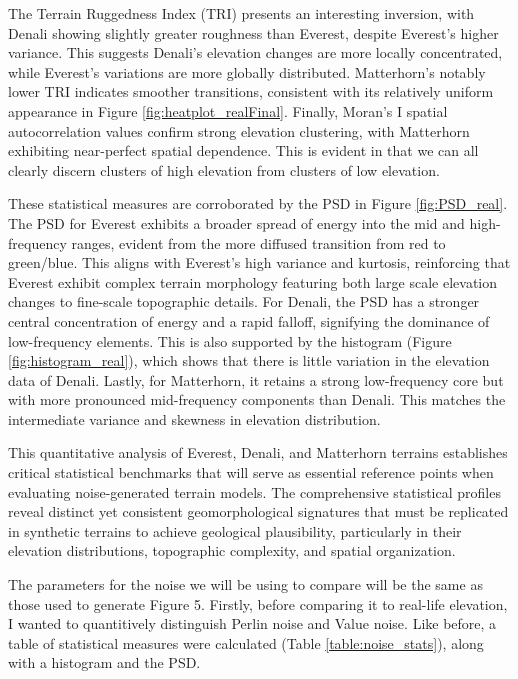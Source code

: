 The Terrain Ruggedness Index (TRI) presents an interesting inversion, with Denali showing slightly greater roughness than Everest, despite Everest's higher variance. This suggests 
Denali's elevation changes are more locally concentrated, while Everest's variations are more globally distributed. Matterhorn's notably lower TRI indicates smoother transitions, 
consistent with its relatively uniform appearance in Figure \ref{fig:heatplot_realFinal}. Finally, Moran's I spatial autocorrelation values confirm strong elevation clustering, with Matterhorn exhibiting near-perfect 
spatial dependence. This is evident in that we can all clearly discern clusters of high elevation from clusters of low elevation. 

These statistical measures are corroborated by the PSD in Figure \ref{fig:PSD_real}. The PSD for Everest exhibits a broader spread of energy into the mid and high-frequency ranges, evident from the more 
diffused transition from red to green/blue. This aligns with Everest's high variance and kurtosis, reinforcing that Everest exhibit complex terrain morphology featuring both large scale 
elevation changes to fine-scale topographic details. For Denali, the PSD has a stronger central concentration of energy and a rapid falloff, signifying the dominance of low-frequency elements. 
This is also supported by the histogram (Figure \ref{fig:histogram_real}), which shows that there is little variation in the elevation data of Denali. Lastly, for Matterhorn, it retains a strong low-frequency core 
but with more pronounced mid-frequency components than Denali. This matches the intermediate variance and skewness in elevation distribution.

This quantitative analysis of Everest, Denali, and Matterhorn terrains establishes critical statistical benchmarks that will serve as essential reference points when evaluating noise-generated 
terrain models. The comprehensive statistical profiles reveal distinct yet consistent geomorphological signatures that must be replicated in synthetic terrains to achieve geological plausibility, 
particularly in their elevation distributions, topographic complexity, and spatial organization.

The parameters for the noise we will be using to compare will be the same as those used to generate Figure 5. Firstly, before comparing it to real-life elevation, I wanted to quantitively 
distinguish Perlin noise and Value noise. Like before, a table of statistical measures were calculated (Table \ref{table:noise_stats}), along with a histogram and the PSD. 

